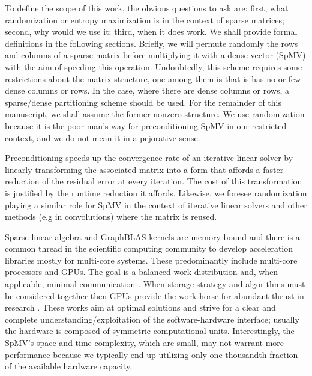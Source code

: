 \documentclass[manuscript,screen]{acmart}
\begin{document}
To define the scope of this work, the obvious questions to ask are:
first, what randomization or entropy maximization is in the context of
sparse matrices; second, why would we use it; third, when it does
work.  We shall provide formal definitions in the following
sections. Briefly, we will permute randomly the rows and columns of a
sparse matrix before multiplying it with a dense vector (SpMV) with
the aim of speeding this operation.  Undoubtedly, this scheme requires
some restrictions about the matrix structure, one among them is that
is has no or few dense columns or rows.  In the case, where there are
dense columns or rows, a sparse/dense partitioning scheme should be
used. For the remainder of this manuscript, we shall assume the former
nonzero structure. We use randomization because it is the poor man's
way for preconditioning SpMV in our restricted context, and we do not
mean it in a pejorative sense.


Preconditioning speeds up the convergence rate of an iterative linear
solver by linearly transforming the associated matrix into a form that
affords a faster reduction of the residual error at every iteration.
The cost of this transformation is justified by the runtime reduction
it affords.  Likewise, we foresee randomization playing a similar role
for SpMV in the context of iterative linear solvers and other methods
(e.g in convolutions) where the matrix is reused.

Sparse linear algebra and GraphBLAS kernels are memory bound and there
is a common thread in the scientific computing community to develop
acceleration libraries mostly for multi-core systems. These
predominantly include multi-core processors and GPUs. The goal is
a balanced work distribution and, when applicable, minimal
communication
\cite{DBLP:journals/siamsc/KayaaslanAU18,DBLP:conf/ieeehpcs/PageK18}. When
storage strategy and algorithms must be considered together then GPUs
provide the work horse for abundant thrust in research
\cite{DBLP:journals/topc/AnztCYDFNTTW20}. These works aim at optimal
solutions and strive for a clear and complete
understanding/exploitation of the software-hardware interface; usually
the hardware is composed of symmetric computational
units. Interestingly, the SpMV's space and time complexity, which are
small, may not warrant more performance because we typically end up
utilizing only one-thousandth fraction of the available hardware
capacity.
\end{document}
